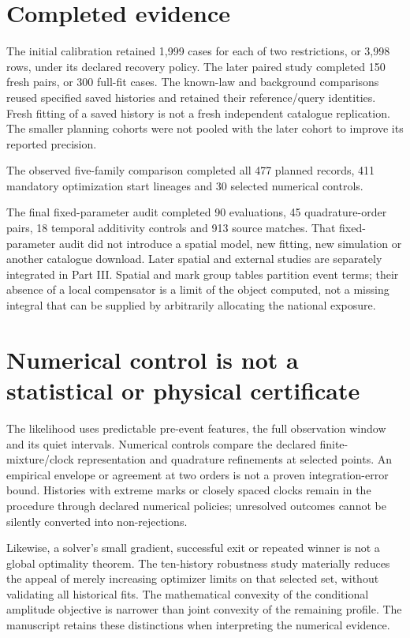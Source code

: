 \section{Completed evidence}

The initial calibration retained 1,999 cases for each of two restrictions, or 3,998 rows, under its declared recovery policy. The later paired study completed 150 fresh pairs, or 300 full-fit cases. The known-law and background comparisons reused specified saved histories and retained their reference/query identities. Fresh fitting of a saved history is not a fresh independent catalogue replication. The smaller planning cohorts were not pooled with the later cohort to improve its reported precision.

The observed five-family comparison completed all 477 planned records, 411 mandatory optimization start lineages and 30 selected numerical controls.

The final fixed-parameter audit completed 90 evaluations, 45 quadrature-order pairs, 18 temporal additivity controls and 913 source matches. That fixed-parameter audit did not introduce a spatial model, new fitting, new simulation or another catalogue download. Later spatial and external studies are separately integrated in Part III. Spatial and mark group tables partition event terms; their absence of a local compensator is a limit of the object computed, not a missing integral that can be supplied by arbitrarily allocating the national exposure.

\section{Numerical control is not a statistical or physical certificate}

The likelihood uses predictable pre-event features, the full observation window and its quiet intervals. Numerical controls compare the declared finite-mixture/clock representation and quadrature refinements at selected points. An empirical envelope or agreement at two orders is not a proven integration-error bound. Histories with extreme marks or closely spaced clocks remain in the procedure through declared numerical policies; unresolved outcomes cannot be silently converted into non-rejections.

Likewise, a solver's small gradient, successful exit or repeated winner is not a global optimality theorem. The ten-history robustness study materially reduces the appeal of merely increasing optimizer limits on that selected set, without validating all historical fits. The mathematical convexity of the conditional amplitude objective is narrower than joint convexity of the remaining profile. The manuscript retains these distinctions when interpreting the numerical evidence.


